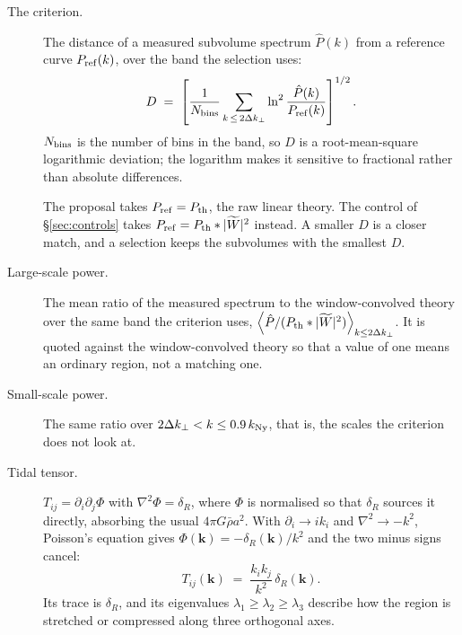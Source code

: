 \documentclass[12pt]{article}
\newcommand{\bk}{\mathbf{k}}
\newcommand{\avg}[1]{\left\langle #1 \right\rangle}
\begin{document}
\begin{description}
\item[The criterion.] The distance of a measured subvolume spectrum
  $\hat P(k)$ from a reference curve $P_{\rm ref}(k)$, over the band the
  selection uses:
  \begin{equation}
    \label{eq:criterion}
    D \;=\; \left[ \frac{1}{N_{\rm bins}}
      \sum_{k \,\le\, 2\Delta k_\perp}
      \ln^2 \frac{\hat P(k)}{P_{\rm ref}(k)} \right]^{1/2} .
  \end{equation}
  $N_{\rm bins}$ is the number of bins in the band, so $D$ is a root-mean-square
  logarithmic deviation; the logarithm makes it sensitive to fractional rather
  than absolute differences.

  The proposal takes $P_{\rm ref} = P_{\rm th}$, the raw linear theory. The
  control of \S\ref{sec:controls} takes
  $P_{\rm ref} = P_{\rm th} \ast |\widetilde W|^2$ instead. A smaller $D$ is a
  closer match, and a selection keeps the subvolumes with the smallest $D$.

\item[Large-scale power.] The mean ratio of the measured spectrum to the
  window-convolved theory over the same band the criterion uses,
  $\avg{\hat P / (P_{\rm th} \ast |\widetilde W|^2)}_{k \le 2\Delta k_\perp}$.
  It is quoted against the window-convolved theory so that a value of one means an
  ordinary region, not a matching one.

\item[Small-scale power.] The same ratio over
  $2\Delta k_\perp < k \le 0.9\,k_{\rm Ny}$, that is, the scales the criterion
  does not look at.

\item[Tidal tensor.] $T_{ij} = \partial_i \partial_j \Phi$ with
  $\nabla^2 \Phi = \delta_R$, where $\Phi$ is normalised so that $\delta_R$
  sources it directly, absorbing the usual $4\pi G \bar\rho a^2$. With
  $\partial_i \to i k_i$ and $\nabla^2 \to -k^2$, Poisson's equation gives
  $\Phi(\bk) = -\delta_R(\bk)/k^2$ and the two minus signs cancel:
  \begin{equation}
    \label{eq:tidal}
    T_{ij}(\bk) \;=\; \frac{k_i k_j}{k^2}\, \delta_R(\bk) .
  \end{equation}
  Its trace is $\delta_R$, and its eigenvalues $\lambda_1 \ge \lambda_2 \ge
  \lambda_3$ describe how the region is stretched or compressed along three
  orthogonal axes.


\end{description}
\end{document}
